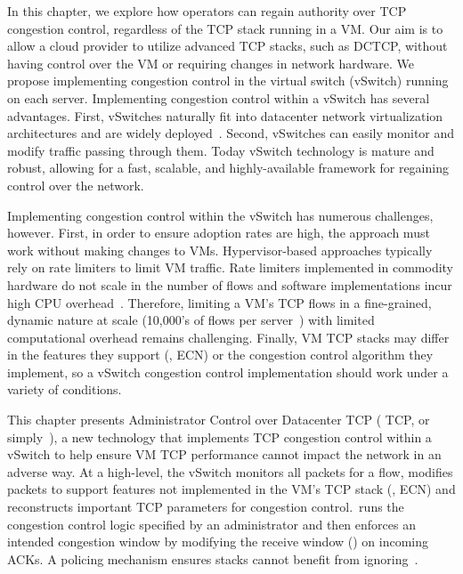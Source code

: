 In this chapter, we explore how operators can regain authority over TCP congestion control, regardless of the TCP stack
running in a VM. Our aim is to allow a cloud provider to utilize advanced TCP stacks, such as DCTCP, without having
control over the VM or requiring changes in network hardware. We propose implementing congestion control in the virtual switch
(vSwitch) running on each server. Implementing congestion control within a vSwitch has several advantages. 
First, vSwitches naturally fit into datacenter network virtualization architectures and are widely
deployed~\cite{Pfaff2015ovs}. Second, vSwitches can easily monitor and modify traffic passing through them. 
Today vSwitch technology is mature and robust, allowing for a fast, scalable,
and highly-available framework for regaining control over the network. 


Implementing congestion control within the vSwitch has numerous challenges, however. First, in order to ensure adoption rates are high, the 
approach must work without making changes to VMs. 
Hypervisor-based approaches typically rely on rate limiters to limit VM traffic. Rate limiters implemented in
commodity hardware do not scale in the number of flows and software implementations incur high CPU overhead~\cite{radhakrishnan2014senic}. 
Therefore, limiting a VM's TCP flows in a fine-grained, dynamic nature
at scale (10,000's of flows per server~\cite{180302}) with limited computational overhead remains challenging. 
Finally, VM TCP stacks may differ in the features they support (\eg{}, ECN) or the congestion
control algorithm they implement, so a vSwitch congestion control implementation should work under a variety
of conditions. 

This chapter presents Administrator Control over Datacenter TCP (\acdc{} TCP, or simply~\acdc{}), a new technology that implements 
TCP congestion control within a vSwitch to help ensure VM
TCP performance cannot impact the network in an adverse way. At a high-level, the vSwitch monitors all packets for a flow, modifies 
packets to support features not implemented in the VM's TCP stack (\eg{}, ECN) and reconstructs
important TCP parameters for congestion control.~\acdc runs the congestion control logic specified by an administrator and then enforces an intended
congestion window by modifying the receive window (\rwnd{}) on incoming ACKs. A policing
mechanism ensures stacks cannot benefit from ignoring~\rwnd{}.%

